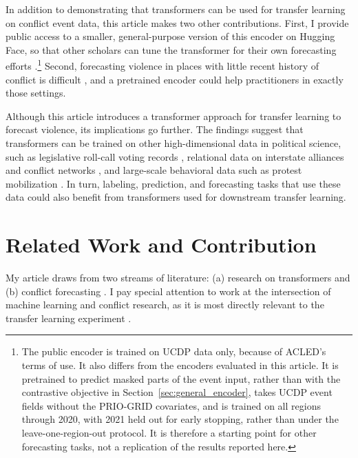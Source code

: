 \documentclass[11pt, letterpaper]{article}
\begin{document}
In addition to demonstrating that transformers can be used for transfer learning on conflict event data, this article makes two other contributions. First, I provide public access to a smaller, general-purpose version of this encoder on Hugging Face, so that other scholars can tune the transformer for their own forecasting efforts \citep{edgerton2026geoconflict}.\footnote{The public encoder is trained on UCDP data only, because of ACLED's terms of use. It also differs from the encoders evaluated in this article. It is pretrained to predict masked parts of the event input, rather than with the contrastive objective in Section~\ref{sec:general_encoder}, takes UCDP event fields without the PRIO-GRID covariates, and is trained on all regions through 2020, with 2021 held out for early stopping, rather than under the leave-one-region-out protocol. It is therefore a starting point for other forecasting tasks, not a replication of the results reported here.} Second, forecasting violence in places with little recent history of conflict is difficult \citep{bazzi2022promise, cederman2017predicting, mueller2022hard}, and a pretrained encoder could help practitioners in exactly those settings.

Although this article introduces a transformer approach for transfer learning to forecast violence, its implications go further. The findings suggest that transformers can be trained on other high-dimensional data in political science, such as legislative roll-call voting records \citep{poole1985spatial}, relational data on interstate alliances and conflict networks \citep{leeds2002atop, minhas2019amen, olivella2022dsbm}, and large-scale behavioral data such as protest mobilization \citep{larson2019protest}. In turn, labeling, prediction, and forecasting tasks that use these data could also benefit from transformers used for downstream transfer learning.
\section{Related Work and Contribution}
\label{sec:related}
My article draws from two streams of literature: (a) research on transformers \citep{devlin2019bert, vaswani2017attention} and (b) conflict forecasting \citep{goldstone2010pitf, hegre2019views, hegre2021views2020, mueller2018reading}. I pay special attention to work at the intersection of machine learning and conflict research, as it is most directly relevant to the transfer learning experiment \citep{dorff2020networks, hu2022conflibert, radford2022highres}. 
\end{document}

